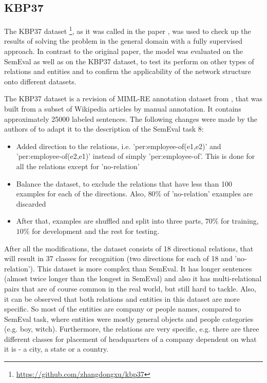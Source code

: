 \subsection{KBP37}
The KBP37 dataset \footnote{\url{https://github.com/zhangdongxu/kbp37}}, as it was called in the paper \cite{DBLP:journals/corr/ZhangW15a}, was used 
to check up the results of solving the problem in the general domain with a fully supervised 
approach. In contrast to the original paper, the model was evaluated on the SemEval as well as on the KBP37 dataset, to test its perform on other types of relations and entities and to confirm the applicability of the network structure onto different datasets.

The KBP37 dataset is a revision of MIML-RE annotation dataset from \cite{angeli2014combining}, that 
was built from a subset of Wikipedia articles by manual annotation. It contains approximately 25000 labeled sentences. The  
 following changes were made by the authors of \cite{DBLP:journals/corr/ZhangW15a} to adapt it to the description of the SemEval task 8:
\begin{itemize}
  \item Added direction to the relations, i.e. 'per:employee-of(e1,e2)' and 'per:employee-of(e2,e1)' 
  instead of simply 'per:employee-of'. This is done for all the relations except for 'no-relation'
  \item Balance the dataset, to exclude the relations that have less than 100 examples for each of 
  the directions. Also, $80\%$ of 'no-relation' examples are discarded
  \item After that, examples are shuffled and split into three parts, $70\%$ for training, $10\%$ for 
  development and the rest for testing.  
\end{itemize}
After all the modifications, the dataset consists of 18 directional relations, that will result in 37 classes for 
recognition (two directions for each of 18 and 'no-relation'). This dataset is more complex than SemEval. It has longer sentences (almost twice longer than the 
longest in SemEval) and also it has multi-relational pairs that are of course common in 
the real world, but still hard to tackle. Also, it can be observed that both relations and entities in this dataset are more 
specific. So most of the entities are company or people names, compared to 
SemEval task, where entities were mostly general objects and people categories (e.g. boy, witch). 
Furthermore, the relations are very specific, e.g. there are three different classes for placement of 
headquarters of a company dependent on what it is - a city, a state or a country.


